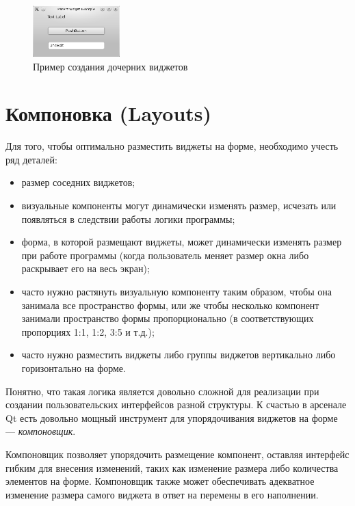 \begin{figure}[htb]
\begin{center}
\includegraphics[width=0.3\textwidth]{img/ris_13_3}
\caption[Пример создания дочерних виджетов]{Пример создания дочерних виджетов}
\label{ch13:refDrawing2}
\end{center}
\end{figure}

\section[Компоновка (Layouts)]{Компоновка (Layouts)}
Для того, чтобы оптимально разместить виджеты на форме, необходимо учесть ряд деталей:

\begin{itemize}
\item размер соседних виджетов;
\item визуальные компоненты могут динамически изменять размер, исчезать или появляться в следствии работы логики
программы;
\item форма, в которой размещают виджеты, может динамически изменять размер при  работе программы (когда пользователь
меняет размер окна либо раскрывает его на весь экран);
\item часто нужно растянуть визуальную компоненту таким образом, чтобы она занимала все пространство формы, или же чтобы
несколько компонент занимали пространство формы пропорционально (в соответствующих пропорциях 1:1, 1:2, 3:5 и т.д.);
\item часто нужно разместить виджеты либо группы виджетов вертикально либо горизонтально на форме.
\end{itemize}

Понятно, что такая логика является довольно сложной для реализации при создании пользовательских интерфейсов разной
структуры. К счастью в арсенале Qt есть довольно мощный инструмент для упорядочивания виджетов на форме ---
\emph{компоновщик}.

Компоновщик позволяет упорядочить размещение компонент, оставляя интерфейс гибким для внесения изменений, таких как
изменение размера либо количества элементов на форме. Компоновщик также может обеспечивать адекватное изменение размера
самого виджета в ответ на перемены в его наполнении.

